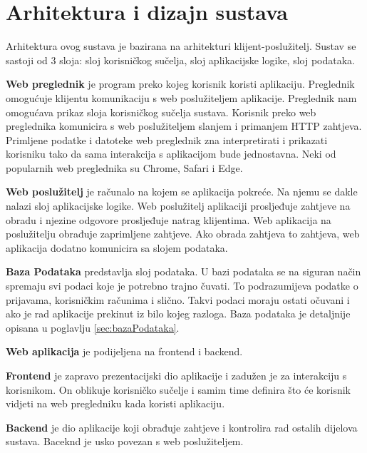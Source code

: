 \chapter{Arhitektura i dizajn sustava}
		
		Arhitektura ovog sustava je bazirana na arhitekturi klijent-poslužitelj. Sustav se sastoji od 3 sloja: sloj korisničkog sučelja, sloj aplikacijske logike, sloj podataka.
		
		\textbf{Web preglednik} je program preko kojeg korisnik koristi aplikaciju. Preglednik omogućuje klijentu komunikaciju s web poslužiteljem aplikacije. Preglednik nam omogućava prikaz sloja korisničkog sučelja sustava. Korisnik preko web preglednika komunicira s web poslužiteljem slanjem i primanjem HTTP zahtjeva. Primljene podatke i datoteke web preglednik zna interpretirati i prikazati korisniku tako da sama interakcija s aplikacijom bude jednostavna. Neki od popularnih web preglednika su Chrome, Safari i Edge.
		
		\textbf{Web poslužitelj} je računalo na kojem se aplikacija pokreće. Na njemu se dakle nalazi sloj aplikacijske logike. Web poslužitelj aplikaciji prosljeđuje zahtjeve na obradu i njezine odgovore prosljeđuje natrag klijentima. Web aplikacija na poslužitelju obrađuje zaprimljene zahtjeve. Ako obrada zahtjeva to zahtjeva, web aplikacija dodatno komunicira sa slojem podataka.
		
		\textbf{Baza Podataka} predstavlja sloj podataka. U bazi podataka se na siguran način spremaju svi podaci koje je potrebno trajno čuvati. To podrazumijeva podatke o prijavama, korisničkim računima i slično. Takvi podaci moraju ostati očuvani i ako je rad aplikacije prekinut iz bilo kojeg razloga. Baza podataka je detaljnije opisana u poglavlju  \ref{sec:bazaPodataka}.
		
		\textbf{Web aplikacija} je podijeljena na frontend i backend.
		
		\textbf{Frontend} je zapravo prezentacijski dio aplikacije i zadužen je za interakciju s korisnikom. On oblikuje korisničko sučelje i samim time definira što će korisnik vidjeti na web pregledniku kada koristi aplikaciju.
		
		\textbf{Backend} je dio aplikacije koji obrađuje zahtjeve i kontrolira rad ostalih dijelova sustava. Baceknd je usko povezan s web poslužiteljem.
		

